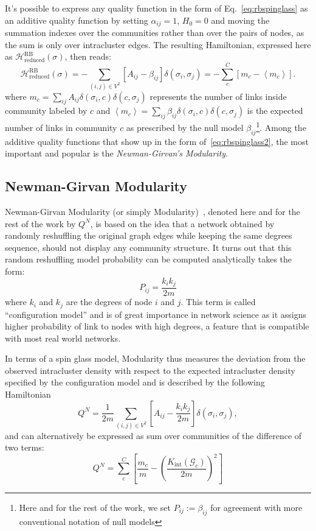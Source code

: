 It's possible to express any quality function in the form of Eq.~\ref{eq:rbspinglass} as an additive quality function by setting $\alpha_{ij}=1$, $H_0=0$ and moving the summation indexes over the communities rather than over the pairs of nodes, as the sum is only over intracluster edges. The resulting Hamiltonian, expressed here as $\mathcal{H}^{\textrm{RB}}_{\textrm{reduced}}(\sigma)$, then reads:
\begin{equation}\label{eq:rbspinglass2}
\mathcal{H}^{\textrm{RB}}_{\textrm{reduced}}(\sigma) = -\sum_{(i,j) \in V^2} \left[ A_{ij} - \beta_{ij} \right] \delta(\sigma_i,\sigma_j) = - \sum \limits_{c}^C \left[ m_c - \left< m_c \right> \right].
\end{equation}
where $m_c=\sum_{ij}A_{ij}\delta(\sigma_i,c)\delta(c,\sigma_j)$ represents the number of links inside community labeled by $c$ and $\left <m_c \right >=\sum_{ij}\beta_{ij}\delta(\sigma_i,c)\delta(c,\sigma_j)$ is the expected number of links in community $c$ as prescribed by the null model $\beta_{ij}$\footnote{Here and for the rest of the work, we set $P_{ij}:=\beta_{ij}$ for agreement with more conventional notation of null models}. 
Among the additive quality functions that show up in the form of~\ref{eq:rbspinglass2}, the most important and popular is the \emph{Newman-Girvan's Modularity}.

\subsection{Newman-Girvan Modularity}\label{sec:newman_modularity}
Newman-Girvan Modularity (or simply Modularity)~\cite{newman2006}, denoted here and for the rest of the work by $Q^N$, is based on the idea that a network obtained by randomly reshuffling the original graph edges while keeping the same degrees sequence, should not display any community structure. It turns out that this random reshuffling model probability can be computed analytically takes the form:
\begin{equation}\label{eq:configuration_model}
P_{ij} = \frac{k_i k_j}{2m}
\end{equation}
where $k_i$ and $k_j$ are the degrees of node $i$ and $j$. This term is called ``configuration model'' and is of great importance in network science as it assigns higher probability of link to nodes with high degrees, a feature that is compatible with most real world networks.

In terms of a spin glass model, Modularity thus measures the deviation from the observed intracluster density with respect to the expected intracluster density specified by the configuration model and is described by the following Hamiltonian
\begin{equation}\label{eq:newmanmodularityspinglass}
Q^N =  \frac{1}{2m} \sum_{ (i,j) \in V^2} \left[ A_{ij} - \frac{k_i k_j}{2m} \right] \delta(\sigma_i,\sigma_j),
\end{equation}
and can alternatively be expressed as sum over communities of the difference of two terms:
\begin{equation}\label{eq:newmanmodularity}
Q^N = \sum_{c}^{C} \left[ \frac{m_c}{m} - \left( \frac{K_{\textrm{int}}(\mathcal{G}_c)}{2m} \right)^2 \right]
\end{equation}

